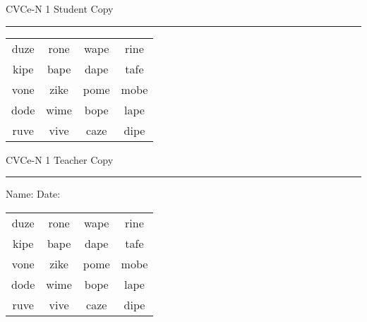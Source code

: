 \documentclass{memoir}
\begin{document}

\footnotesize \noindent
CVCe-N 1 \hfill Student Copy
\smallskip
\hrule

\Large

\setlength{\tabcolsep}{14pt}
\def\arraystretch{2}

{\selectfont


\begin{vplace}[0.5]
\begin{center}
\begin{tabular}{cccc}
duze & rone & wape & rine \\
kipe & bape & dape & tafe \\
vone & zike & pome & mobe \\
dode & wime & bope & lape \\
ruve & vive & caze & dipe \\
\end{tabular}
\end{center}
\end{vplace}

}

\newpage

\footnotesize \noindent
CVCe-N 1 \hfill Teacher Copy
\smallskip
\hrule

\small

\vfill

\noindent
Name: \underline{\hspace{1.75in}} \hfill Date: \underline{\hspace{1in}}

\Large

{\selectfont


\begin{vplace}[0.5]
\begin{center}
\begin{tabular}{cccc}
duze & rone & wape & rine \\
kipe & bape & dape & tafe \\
vone & zike & pome & mobe \\
dode & wime & bope & lape \\
ruve & vive & caze & dipe \\
\end{tabular}
\end{center}
\end{vplace}



}
\end{document}
